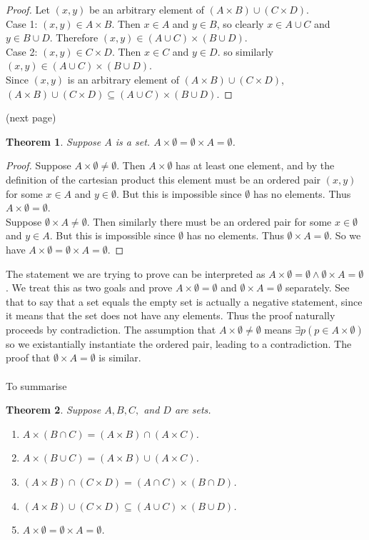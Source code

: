 \documentclass{report}
\newtheorem*{theorem}{Theorem}
\theoremstyle{definition}
\begin{document}
\begin{proof}
Let $(x,y)$ be an arbitrary element of $(A\times B)\cup(C\times D)$.\\
Case 1: $(x,y)\in A\times B$. Then $x\in A$ and $y\in B$, so clearly $x\in A\cup C$ and $y\in B\cup D$. Therefore 
$(x,y)\in(A\cup C)\times(B\cup D)$.\\
Case 2: $(x,y)\in C\times D$. Then $x\in C$ and $y\in D$. so similarly $(x,y)\in(A\cup C)\times(B\cup D)$.\\
Since $(x,y)$ is an arbitrary element of $(A\times B)\cup(C\times D)$, $(A\times B)\cup(C\times D)\subseteq(A\cup C)\times(B\cup D)$.
\end{proof}
\noindent(next page)\newpage
\begin{theorem}
Suppose $A$ is a set. $A\times\emptyset=\emptyset\times A=\emptyset$.
\end{theorem}
\begin{proof}
Suppose $A\times\emptyset\neq\emptyset$. Then $A\times\emptyset$ has at least one element, and by the definition of the cartesian product this element must be an ordered pair $(x,y)$ 
for some $x\in A$ and $y\in\emptyset$. But this is impossible since $\emptyset$ has no elements. Thus $A\times\emptyset=\emptyset$.\\
\indent Suppose $\emptyset\times A\neq\emptyset$. Then similarly there must be an ordered pair for some $x\in\emptyset$ and $y\in A$. But this is impossible since $\emptyset$ has no elements.
Thus $\emptyset\times A=\emptyset$. So we have $A\times\emptyset=\emptyset\times A=\emptyset$.
\end{proof}
\noindent The statement we are trying to prove can be interpreted as $A\times\emptyset=\emptyset\land\emptyset\times A=\emptyset$. We treat this as two goals and prove $A\times\emptyset=\emptyset$
and $\emptyset\times A=\emptyset$ separately. See that to say that a set equals the empty set is actually a negative statement, since it means that the set does not have any elements. Thus 
the proof naturally proceeds by contradiction. The assumption that $A\times\emptyset\neq\emptyset$
means $\exists p(p\in A\times\emptyset)$ so we existantially instantiate the ordered pair, leading to a contradiction. The proof that $\emptyset\times A=\emptyset$ is similar.\\
\vspace{1mm}\\
To summarise
\begin{theorem}
Suppose $A,B,C,$ and $D$ are sets.
\begin{enumerate}
\item $A\times(B\cap C)=(A\times B)\cap(A\times C)$.
\item $A\times(B\cup C)=(A\times B)\cup(A\times C)$.
\item $(A\times B)\cap(C\times D)=(A\cap C)\times(B\cap D)$.
\item $(A\times B)\cup(C\times D)\subseteq(A\cup C)\times(B\cup D)$.
\item $A\times\emptyset=\emptyset\times A=\emptyset$.
\end{enumerate}
\end{theorem}
\end{document}
